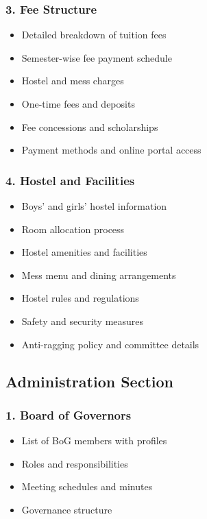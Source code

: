 \documentclass[12pt,a4paper]{report}
\begin{document}
\subsubsection*{3. Fee Structure}
\begin{itemize}
    \item Detailed breakdown of tuition fees
    \item Semester-wise fee payment schedule
    \item Hostel and mess charges
    \item One-time fees and deposits
    \item Fee concessions and scholarships
    \item Payment methods and online portal access
\end{itemize}

\subsubsection*{4. Hostel and Facilities}
\begin{itemize}
    \item Boys' and girls' hostel information
    \item Room allocation process
    \item Hostel amenities and facilities
    \item Mess menu and dining arrangements
    \item Hostel rules and regulations
    \item Safety and security measures
    \item Anti-ragging policy and committee details
\end{itemize}

\subsection{Administration Section}

\subsubsection*{1. Board of Governors}
\begin{itemize}
    \item List of BoG members with profiles
    \item Roles and responsibilities
    \item Meeting schedules and minutes
    \item Governance structure
\end{itemize}
\end{document}
